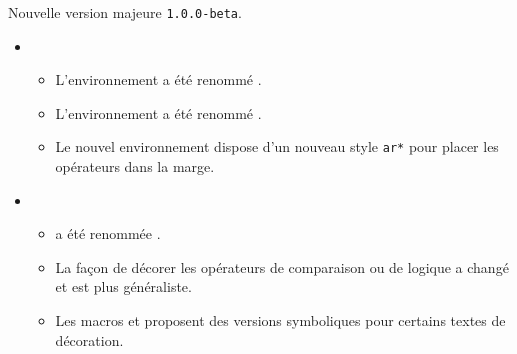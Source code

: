 Nouvelle version majeure \verb+1.0.0-beta+.

\begin{itemize}[itemsep=.5em]
    \item {}
    \begin{itemize}[itemsep=.5em]
        \item L'environnement  a été renommé .

        \item L'environnement  a été renommé .

        \item Le nouvel environnement  dispose d'un nouveau style \verb#ar*# pour placer les opérateurs dans la marge.
    \end{itemize}


    \item {}
    \begin{itemize}[itemsep=.5em]
        \item {} a été renommée .

        \item La façon de décorer les opérateurs de comparaison ou de logique a changé et est plus généraliste.

        \item Les macros  et  proposent des versions symboliques pour certains textes de décoration.
    \end{itemize}
\end{itemize}


\separation
